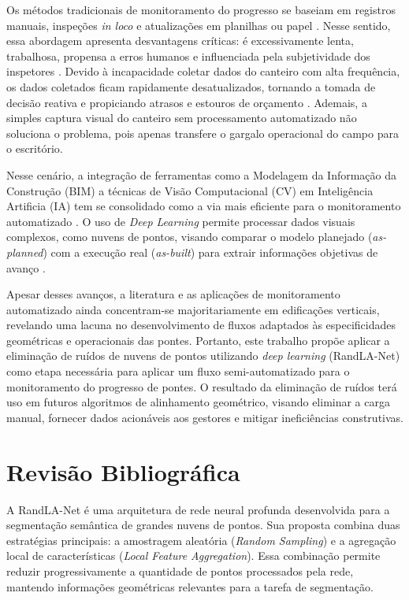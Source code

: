 \documentclass[conference]{IEEEtran}
\begin{document}
Os métodos tradicionais de monitoramento do progresso se baseiam em registros manuais, inspeções \textit{in loco} e atualizações em planilhas ou papel \cite{Pal2023}. Nesse sentido, essa abordagem apresenta desvantagens críticas: é excessivamente lenta, trabalhosa, propensa a erros humanos e influenciada pela subjetividade dos inspetores \cite{Qureshi2023}. Devido à incapacidade coletar dados do canteiro com alta frequência, os dados coletados ficam rapidamente desatualizados, tornando a tomada de decisão reativa e propiciando atrasos e estouros de orçamento \cite{Reja2022}. Ademais, a simples captura visual do canteiro sem processamento automatizado não soluciona o problema, pois apenas transfere o gargalo operacional do campo para o escritório.  



Nesse cenário, a integração de ferramentas como a Modelagem da Informação da Construção (BIM) a técnicas de Visão Computacional (CV) em Inteligência Artificia (IA) tem se consolidado como a via mais eficiente para o monitoramento automatizado \cite{Pal2023}. O uso de \textit{Deep Learning} permite processar dados visuais complexos, como nuvens de pontos, visando comparar o modelo planejado (\textit{as-planned}) com a execução real (\textit{as-built}) para extrair informações objetivas de avanço \cite{Reja2022,Braun2020 }.  

Apesar desses avanços, a literatura e as aplicações de monitoramento automatizado ainda concentram-se majoritariamente em edificações verticais, revelando uma lacuna no desenvolvimento de fluxos adaptados às especificidades geométricas e operacionais das pontes. Portanto, este trabalho propõe aplicar a eliminação de ruídos de nuvens de pontos utilizando \textit{deep learning} (RandLA-Net) como etapa necessária para aplicar um fluxo semi-automatizado para o monitoramento do progresso de pontes. O resultado da eliminação de ruídos terá uso em futuros algoritmos de alinhamento geométrico, visando eliminar a carga manual, fornecer dados acionáveis aos gestores e mitigar ineficiências construtivas.


\section{Revisão Bibliográfica}
A RandLA-Net é uma arquitetura de rede neural profunda desenvolvida para a segmentação semântica de grandes nuvens de pontos. Sua proposta combina duas estratégias principais: a amostragem aleatória (\textit{Random Sampling}) e a agregação local de características (\textit{Local Feature Aggregation}). Essa combinação permite reduzir progressivamente a quantidade de pontos processados pela rede, mantendo informações geométricas relevantes para a tarefa de segmentação.
\end{document}
